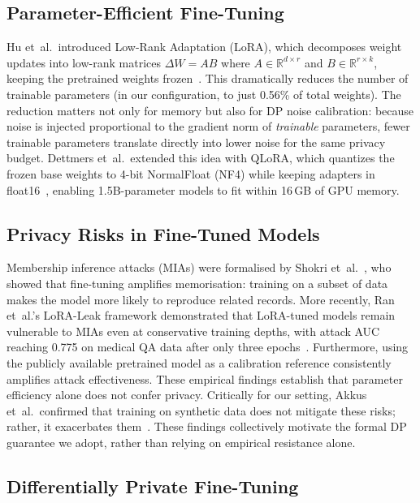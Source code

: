 \documentclass[conference]{IEEEtran}
\begin{document}
\subsection{Parameter-Efficient Fine-Tuning}

Hu et~al.\ introduced Low-Rank Adaptation (LoRA), which decomposes weight updates into low-rank matrices $\Delta W = AB$ where $A \in \mathbb{R}^{d \times r}$ and $B \in \mathbb{R}^{r \times k}$, keeping the pretrained weights frozen~\cite{hu2022lora}. This dramatically reduces the number of trainable parameters (in our configuration, to just 0.56\% of total weights). The reduction matters not only for memory but also for DP noise calibration: because noise is injected proportional to the gradient norm of \emph{trainable} parameters, fewer trainable parameters translate directly into lower noise for the same privacy budget. Dettmers et~al.\ extended this idea with QLoRA, which quantizes the frozen base weights to 4-bit NormalFloat (NF4) while keeping adapters in float16~\cite{qlora}, enabling 1.5B-parameter models to fit within 16\,GB of GPU memory.

\subsection{Privacy Risks in Fine-Tuned Models}

Membership inference attacks (MIAs) were formalised by Shokri et~al.~\cite{shokri2017membership}, who showed that fine-tuning amplifies memorisation: training on a subset of data makes the model more likely to reproduce related records. More recently, Ran et~al.'s LoRA-Leak framework demonstrated that LoRA-tuned models remain vulnerable to MIAs even at conservative training depths, with attack AUC reaching 0.775 on medical QA data after only three epochs~\cite{loraleak}. Furthermore, using the publicly available pretrained model as a calibration reference consistently amplifies attack effectiveness. These empirical findings establish that parameter efficiency alone does not confer privacy. Critically for our setting, Akkus et~al.\ confirmed that training on synthetic data does not mitigate these risks; rather, it exacerbates them~\cite{akkus2025}. These findings collectively motivate the formal DP guarantee we adopt, rather than relying on empirical resistance alone.

\subsection{Differentially Private Fine-Tuning}
\end{document}
